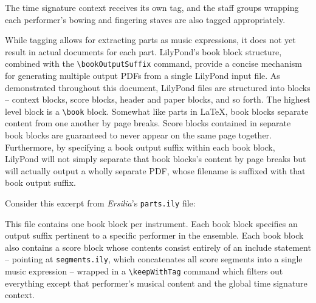 
\noindent The time signature context receives its own tag, and the staff groups
wrapping each performer's bowing and fingering staves are also tagged
appropriately.

While tagging allows for extracting parts as music expressions, it does not yet
result in actual documents for each part. LilyPond's book block structure,
combined with the \texttt{\textbackslash{}bookOutputSuffix} command, provide a
concise mechanism for generating multiple output PDFs from a single LilyPond
input file. As demonstrated throughout this document, LilyPond files are
structured into blocks -- context blocks, score blocks, header and paper
blocks, and so forth. The highest level block is a
\texttt{\textbackslash{}book} block. Somewhat like parts in LaTeX, book blocks
separate content from one another by page breaks. Score blocks contained in
separate book blocks are guaranteed to never appear on the same page together.
Furthermore, by specifying a book output suffix within each book block,
LilyPond will not simply separate that book blocks's content by page breaks but
will actually output a wholly separate PDF, whose filename is suffixed with
that book output suffix.

Consider this excerpt from \emph{Ersilia}'s \texttt{parts.ily} file:


\noindent This file contains one book block per instrument. Each book block
specifies an output suffix pertinent to a specific performer in the ensemble.
Each book block also contains a score block whose contents consist entirely of
an include statement -- pointing at \texttt{segments.ily}, which concatenates
all score segments into a single music expression -- wrapped in a
\texttt{\textbackslash{}keepWithTag} command which filters out everything
except that performer's musical content and the global time signature context.

